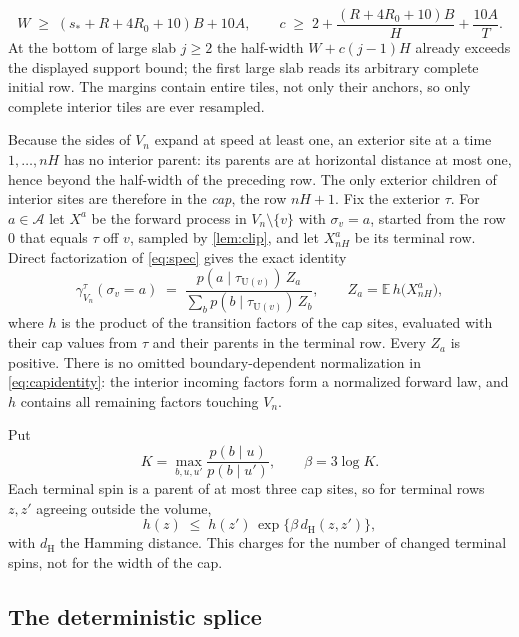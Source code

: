 \documentclass[11pt]{article}
\theoremstyle{plain}
\theoremstyle{definition}
\theoremstyle{remark}
\newcommand{\A}{\mathcal{A}}
\newcommand{\E}{\mathbb{E}}
\newcommand{\dH}{d_{\mathrm{H}}}
\newcommand{\Ue}{\mathrm{U}}
\begin{document}
\begin{equation}
W\;\ge\;(s_*+R+4R_0+10)B+10A,\qquad c\;\ge\;2+\frac{(R+4R_0+10)B}{H}+\frac{10A}{T}.
\label{eq:Wc}
\end{equation}
At the bottom of large slab $j\ge2$ the half-width $W+c(j-1)H$ already exceeds the displayed support bound; the first large slab reads its arbitrary complete initial row. The margins contain entire tiles, not only their anchors, so only complete interior tiles are ever resampled.

Because the sides of $V_n$ expand at speed at least one, an exterior site at a time $1,\dots,nH$ has no interior parent: its parents are at horizontal distance at most one, hence beyond the half-width of the preceding row. The only exterior children of interior sites are therefore in the \emph{cap}, the row $nH+1$. Fix the exterior $\tau$. For $a\in\A$ let $X^a$ be the forward process in $V_n\setminus\{v\}$ with $\sigma_v=a$, started from the row $0$ that equals $\tau$ off $v$, sampled by \cref{lem:clip}, and let $X^a_{nH}$ be its terminal row. Direct factorization of \eqref{eq:spec} gives the exact identity
\begin{equation}
\gamma^\tau_{V_n}(\sigma_v=a)\;=\;\frac{p(a\mid\tau_{\Ue(v)})\,Z_a}{\sum_b p(b\mid\tau_{\Ue(v)})\,Z_b},\qquad Z_a=\E\,h\bigl(X^a_{nH}\bigr),
\label{eq:capidentity}
\end{equation}
where $h$ is the product of the transition factors of the cap sites, evaluated with their cap values from $\tau$ and their parents in the terminal row. Every $Z_a$ is positive. There is no omitted boundary-dependent normalization in \eqref{eq:capidentity}: the interior incoming factors form a normalized forward law, and $h$ contains all remaining factors touching $V_n$.

Put
\begin{equation}
K=\max_{b,u,u'}\frac{p(b\mid u)}{p(b\mid u')},\qquad\beta=3\log K.
\label{eq:K}
\end{equation}
Each terminal spin is a parent of at most three cap sites, so for terminal rows $z,z'$ agreeing outside the volume,
\begin{equation}
h(z)\;\le\;h(z')\,\exp\bigl\{\beta\,\dH(z,z')\bigr\},
\label{eq:lipschitz}
\end{equation}
with $\dH$ the Hamming distance. This charges for the number of changed terminal spins, not for the width of the cap.

\subsection{The deterministic splice}
\label{sec:splice}
\end{document}
